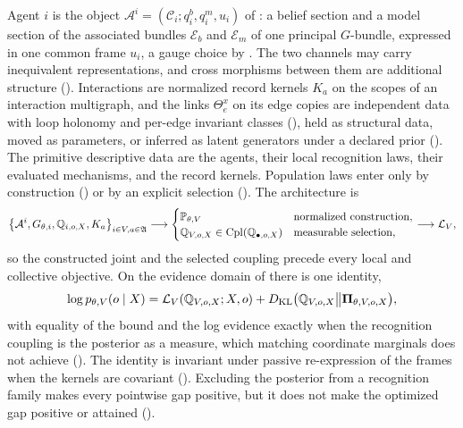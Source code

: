 Agent $i$ is the object $\mathcal A^i=(\mathcal C_i;q_i^b,q_i^m,u_i)$ of : a belief
section and a model section of the associated bundles $\mathcal E_b$ and $\mathcal E_m$ of one principal
$G$-bundle, expressed in one common frame $u_i$, a gauge choice by . The
two channels may carry inequivalent representations, and cross morphisms between them are additional
structure (). Interactions are normalized record kernels $K_a$ on the scopes
of an interaction multigraph, and the links $\Theta_e^x$ on its edge copies are independent data with loop
holonomy and per-edge invariant classes (), held as structural data,
moved as parameters, or inferred as latent generators under a declared prior ().
The primitive descriptive data are the agents, their local recognition laws, their evaluated mechanisms,
and the record kernels.
Population laws enter only by construction () or by an explicit
selection (). The architecture is
\begin{equation}
\left\{
\mathcal A^i,G_{\theta,i},\mathbb Q_{i,o,X},K_a
\right\}_{i\in V,a\in\mathfrak A}
\longrightarrow
\begin{cases}
\mathbb P_{\theta,V} & \text{normalized construction},\\
\mathbb Q_{V,o,X}\in\operatorname{Cpl}(\mathbb Q_{\bullet,o,X})
& \text{measurable selection},
\end{cases}
\longrightarrow
\mathcal L_V,
\label{eq:intro-local-to-global-architecture}
\end{equation}
so the constructed joint and the selected coupling precede every local and collective objective. On the
evidence domain of  there is one identity,
\begin{equation}
\log p_{\theta,V}(o\mid X)
=\mathcal L_V(\mathbb Q_{V,o,X};X,o)
+D_{\mathrm{KL}}\bigl(\mathbb Q_{V,o,X}\big\Vert\boldsymbol\Pi_{\theta,V,o,X}\bigr),
\label{eq:elbo-intro-identity}
\end{equation}
with equality of the bound and the log evidence exactly when the recognition coupling is the posterior as
a measure, which matching coordinate marginals does not achieve (). The
identity is invariant under passive re-expression of the frames when the kernels are covariant
(). Excluding the
posterior from a recognition family makes every pointwise gap positive, but it does not make the optimized
gap positive or attained ().

